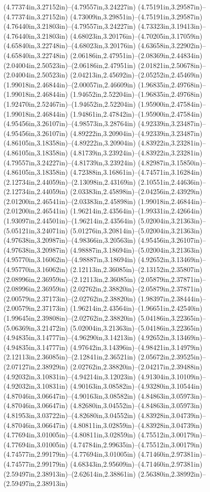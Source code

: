 (4.77374in,3.27152in)--(4.79557in,3.24227in) (4.75191in,3.29587in)--(4.77374in,3.27152in) (4.73009in,3.29851in)--(4.75191in,3.29587in) (4.76440in,3.21803in)--(4.79557in,3.24227in) (4.73323in,3.19413in)--(4.76440in,3.21803in) (4.68023in,3.20176in)--(4.70205in,3.17059in) (4.65840in,3.22748in)--(4.68023in,3.20176in) (4.63658in,3.22902in)--(4.65840in,3.22748in) (2.06186in,2.47951in)--(2.08369in,2.44834in) (2.04004in,2.50523in)--(2.06186in,2.47951in) (2.01821in,2.50678in)--(2.04004in,2.50523in) (2.04213in,2.45692in)--(2.05252in,2.45469in) (1.99018in,2.46844in)--(2.00057in,2.46609in) (1.96835in,2.49768in)--(1.99018in,2.46844in) (1.94652in,2.52204in)--(1.96835in,2.49768in) (1.92470in,2.52467in)--(1.94652in,2.52204in) (1.95900in,2.47584in)--(1.99018in,2.46844in) (1.94861in,2.47842in)--(1.95900in,2.47584in) (4.95456in,3.26107in)--(4.98573in,3.28764in) (4.92339in,3.23487in)--(4.95456in,3.26107in) (4.89222in,3.20904in)--(4.92339in,3.23487in) (4.86105in,3.18358in)--(4.89222in,3.20904in) (4.83922in,3.23281in)--(4.86105in,3.18358in) (4.81739in,3.23924in)--(4.83922in,3.23281in) (4.79557in,3.24227in)--(4.81739in,3.23924in) (4.82987in,3.15850in)--(4.86105in,3.18358in) (4.72388in,3.16861in)--(4.74571in,3.16284in) (2.12734in,2.44059in)--(2.13098in,2.43169in) (2.10551in,2.44636in)--(2.12734in,2.44059in) (2.03383in,2.45898in)--(2.04256in,2.43929in) (2.01200in,2.46541in)--(2.03383in,2.45898in) (1.99018in,2.46844in)--(2.01200in,2.46541in) (1.96214in,2.43564in)--(1.99331in,2.42664in) (1.93097in,2.44501in)--(1.96214in,2.43564in) (5.02004in,3.21363in)--(5.05121in,3.24071in) (5.01276in,3.20814in)--(5.02004in,3.21363in) (4.97638in,3.20987in)--(4.98366in,3.20563in) (4.95456in,3.26107in)--(4.97638in,3.20987in) (4.98887in,3.18694in)--(5.02004in,3.21363in) (4.95770in,3.16062in)--(4.98887in,3.18694in) (4.92652in,3.13469in)--(4.95770in,3.16062in) (2.12113in,2.36085in)--(2.13152in,2.35807in) (2.08996in,2.36959in)--(2.12113in,2.36085in) (2.05879in,2.37871in)--(2.08996in,2.36959in) (2.02762in,2.38820in)--(2.05879in,2.37871in) (2.00579in,2.37173in)--(2.02762in,2.38820in) (1.98397in,2.38444in)--(2.00579in,2.37173in) (1.96214in,2.43564in)--(1.96651in,2.42540in) (1.99645in,2.39808in)--(2.02762in,2.38820in) (5.04186in,3.22365in)--(5.06369in,3.21472in) (5.02004in,3.21363in)--(5.04186in,3.22365in) (4.94835in,3.14777in)--(4.96290in,3.14213in) (4.92652in,3.13469in)--(4.94835in,3.14777in) (4.97642in,3.14396in)--(4.98421in,3.14979in) (2.12113in,2.36085in)--(2.12841in,2.36521in) (2.05672in,2.39525in)--(2.07127in,2.38929in) (2.02762in,2.38820in)--(2.04217in,2.39488in) (4.92032in,3.10831in)--(4.94214in,3.12023in) (4.91304in,3.10109in)--(4.92032in,3.10831in) (4.90163in,3.08582in)--(4.93280in,3.10544in) (4.87046in,3.06647in)--(4.90163in,3.08582in) (4.84863in,3.05973in)--(4.87046in,3.06647in) (4.82680in,3.04552in)--(4.84863in,3.05973in) (4.81953in,3.03722in)--(4.82680in,3.04552in) (4.83928in,3.04739in)--(4.87046in,3.06647in) (4.80811in,3.02859in)--(4.83928in,3.04739in) (4.77694in,3.01005in)--(4.80811in,3.02859in) (4.75512in,3.00179in)--(4.77694in,3.01005in) (4.74784in,2.99635in)--(4.75512in,3.00179in) (4.74577in,2.99179in)--(4.77694in,3.01005in) (4.71460in,2.97381in)--(4.74577in,2.99179in) (4.68343in,2.95609in)--(4.71460in,2.97381in) (2.59497in,2.38913in)--(2.62614in,2.38861in) (2.56380in,2.38992in)--(2.59497in,2.38913in) 